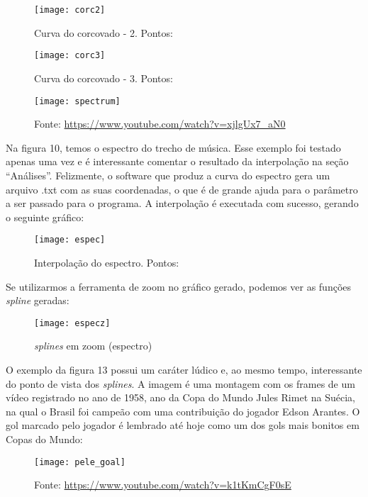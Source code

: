 \documentclass[11pt]{article}
\begin{document}
\begin{figure}[H]
\centering
\texttt{[image: corc2]}
\caption{\small Curva do corcovado - 2. Pontos: \url{}}
\end{figure}

\begin{figure}[H]
\centering
\texttt{[image: corc3]}
\caption{\small Curva do corcovado - 3. Pontos: \url{}}
\end{figure}

\begin{figure}[H]
\centering
\texttt{[image: spectrum]}
\caption{\small Fonte: \url{https://www.youtube.com/watch?v=xjlgUx7_aN0}}
\end{figure} 

Na figura 10, temos o espectro do trecho de música. Esse exemplo
foi testado apenas uma vez e é interessante comentar o resultado da
interpolação na seção ``Análises''. Felizmente, o software que produz a curva do espectro
gera um arquivo .txt com as suas coordenadas, o que é de grande
ajuda para o parâmetro a ser passado para o programa. A interpolação
é executada com sucesso, gerando o seguinte gráfico:

\begin{figure}[H]
\centering
\texttt{[image: espec]}
\caption{\small Interpolação do espectro. Pontos: \url{}}
\end{figure} 

Se utilizarmos a ferramenta de zoom no gráfico gerado, podemos
ver as funções \textit{spline} geradas:

\begin{figure}[H]
\centering
\texttt{[image: especz]}
\caption{\small \textit{splines} em zoom (espectro)}
\end{figure}

O exemplo da figura 13 possui um caráter lúdico e, ao mesmo tempo,
interessante do ponto de vista dos \textit{splines}. A imagem é uma montagem
com os frames de um vídeo registrado no ano de 1958, ano da
Copa do Mundo Jules Rimet na Suécia, na qual o Brasil foi
campeão com uma contribuição do jogador Edson Arantes. O gol marcado
pelo jogador é lembrado até hoje como um dos gols mais bonitos
em Copas do Mundo:

\begin{figure}[H]
\centering
\texttt{[image: pele\_goal]}
\caption{Fonte: \url{https://www.youtube.com/watch?v=k1tKmCgF0sE}}
\end{figure}
\end{document}
